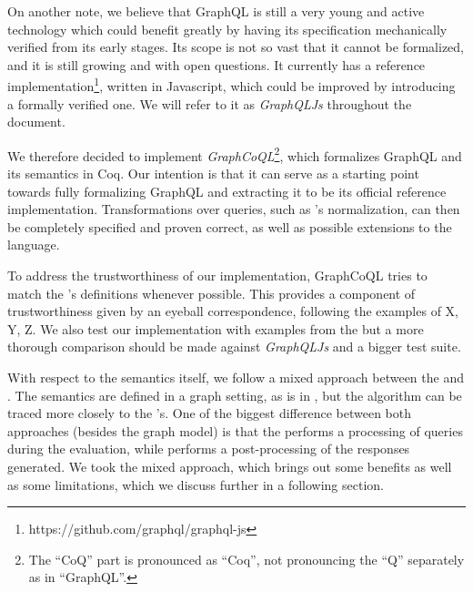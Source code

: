 
On another note, we believe that GraphQL is still a very young and active technology which could benefit greatly by having its specification mechanically verified from its early stages. Its scope is not so vast that it cannot be formalized, and it is still growing and with open questions. It currently has a reference implementation\footnote{https://github.com/graphql/graphql-js}, written in Javascript, which could be improved by introducing a formally verified one. We will refer to it as \textit{GraphQLJs} throughout the document.

 We therefore decided to implement \textit{GraphCoQL}\footnote{The ``CoQ'' part is pronounced as ``Coq'', not pronouncing the ``Q'' separately as in ``GraphQL''.}, which formalizes GraphQL and its semantics in Coq. Our intention is that it can serve as a starting point towards fully formalizing GraphQL and extracting it to be its official reference implementation.  Transformations over queries, such as \HP's normalization, can then be completely specified and proven correct, as well as possible extensions to the language.

To address the trustworthiness of our implementation, GraphCoQL tries to match the \spec's definitions whenever possible. This provides a component of trustworthiness given by an eyeball correspondence, following the examples of X, Y, Z. We also test our implementation with examples from the \spec but a more thorough comparison should be made against \textit{GraphQLJs} and a bigger test suite.

With respect to the semantics itself, we follow a mixed approach between the \spec and \HP. The semantics are defined in a graph setting, as is in \HP, but the algorithm can be traced more closely to the \spec's. One of the biggest difference between both approaches (besides the graph model) is that the \spec performs a processing of queries during the evaluation, while \HP performs a post-processing of the responses generated. We took the mixed approach, which brings out some benefits as well as some limitations, which we discuss further in a following section.

